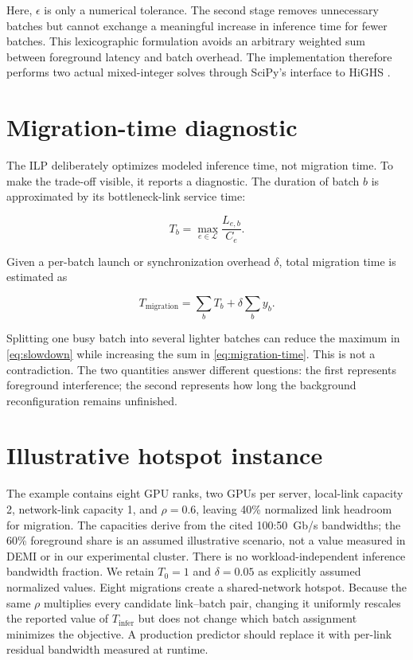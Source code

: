 Here, $\epsilon$ is only a numerical tolerance. The second stage removes
unnecessary batches but cannot exchange a meaningful increase in inference
time for fewer batches. This lexicographic formulation avoids an arbitrary
weighted sum between foreground latency and batch overhead. The implementation
therefore performs two actual mixed-integer solves through SciPy's interface
to HiGHS \cite{scipy2020,huangfu2018highs}.

\section{Migration-time diagnostic}

The ILP deliberately optimizes modeled inference time, not migration time. To
make the trade-off visible, it reports a diagnostic. The duration of batch $b$
is approximated by its bottleneck-link service time:

\begin{equation}
  T_b=\max_{e\in\mathcal{L}}\frac{L_{e,b}}{C_e}.
\end{equation}

Given a per-batch launch or synchronization overhead $\delta$, total migration
time is estimated as

\begin{equation}
  T_{\mathrm{migration}}=\sum_b T_b+\delta\sum_b y_b.
  \label{eq:migration-time}
\end{equation}

Splitting one busy batch into several lighter batches can reduce the maximum in
\cref{eq:slowdown} while increasing the sum in \cref{eq:migration-time}. This
is not a contradiction. The two quantities answer different questions: the
first represents foreground interference; the second represents how long the
background reconfiguration remains unfinished.

\section{Illustrative hotspot instance}

The example contains eight GPU ranks, two GPUs per server, local-link capacity
2, network-link capacity 1, and $\rho=0.6$, leaving 40\% normalized link
headroom for migration. The capacities derive from the cited 100:50~Gb/s
bandwidths; the 60\% foreground share is an assumed illustrative scenario,
not a value measured in DEMI or in our experimental cluster. There is no
workload-independent inference bandwidth fraction. We retain $T_0=1$ and
$\delta=0.05$ as explicitly assumed normalized values. Eight migrations create
a shared-network hotspot. Because the same
$\rho$ multiplies every candidate link--batch pair, changing it uniformly
rescales the reported value of $T_{\mathrm{infer}}$ but does not change which
batch assignment minimizes the objective. A production predictor should
replace it with per-link residual bandwidth measured at runtime.

